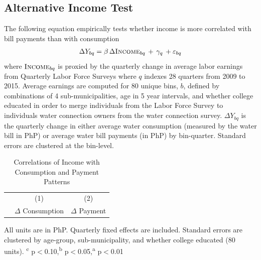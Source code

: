 \documentclass[12pt]{article}
\begin{document}



\subsection{Alternative Income Test}\label{appendix:alternativeincome}

The following equation empirically tests whether income is more correlated with bill payments than with consumption
\begin{align*}
\Delta Y_{bq} = \beta\, \Delta \textsc{Income}_{bq} \,+\, \gamma_q \,+\varepsilon_{bq}
\end{align*}
where $\textsc{Income}_{bq}$ is proxied by the quarterly change in average labor earnings from Quarterly Labor Force Surveys where $q$ indexes 28 quarters from 2009 to 2015.  Average earnings are computed for 80 unique bins, $b$, defined by combinations of 4 sub-municipalities, age in 5 year intervals, and whether college educated in order to merge individuals from the Labor Force Survey to individuals water connection owners from the water connection survey.  $\Delta Y_{bq}$ is the quarterly change in either average water consumption (measured by the water bill in PhP) or average water bill payments (in PhP) by bin-quarter.  Standard errors are clustered at the bin-level.

\begin{table}[!ht]
\small
\centering
\begin{threeparttable}
\caption{Correlations of Income with Consumption and Payment Patterns}\label{table:lfsanalysis}
\vspace{-2mm}
\begin{tabular}{lcc}
\toprule
 & \small (1) & \small (2)  \\
 & \small $\Delta$ Consumption & \small $\Delta$ Payment \\[.5em]
 \toprule

\bottomrule
\end{tabular}
\begin{tablenotes}
\footnotesize
\item All units are in PhP.  Quarterly fixed effects are included.  Standard errors are clustered by age-group, sub-municipality, and whether college educated (80 units).  \textsuperscript{c} p$<$0.10,\textsuperscript{b} p$<$0.05,\textsuperscript{a} p$<$0.01 
\end{tablenotes}
\end{threeparttable}
\end{table}
\end{document}
